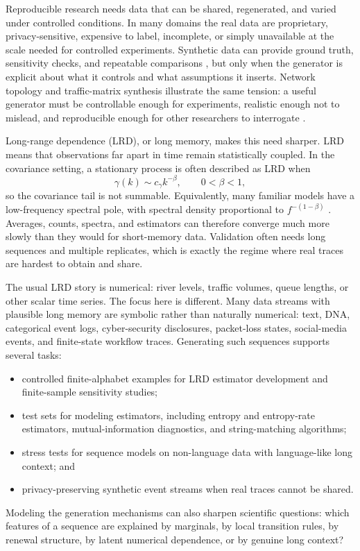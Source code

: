 \documentclass[journal]{IEEEtran}
\begin{document}
Reproducible research needs data that can be shared, regenerated, and varied
under controlled conditions.  In many domains the real data are proprietary,
privacy-sensitive, expensive to label, incomplete, or simply unavailable at the
scale needed for controlled experiments.  Synthetic data can provide ground
truth, sensitivity checks, and repeatable comparisons
\cite{ringberg2008_need}, but only when the generator is explicit about what it
controls and what assumptions it inserts.  Network topology and traffic-matrix
synthesis illustrate the same tension: a useful generator must be controllable
enough for experiments, realistic enough not to mislead, and reproducible enough
for other researchers to interrogate \cite{bowden2014_cold,tune2015_spatiotemporal}.

Long-range dependence (LRD), or long memory, makes this need sharper.  LRD
means that observations far apart in time remain statistically coupled.  In the
covariance setting, a stationary process is often described as LRD when
\begin{equation}
  \gamma(k) \sim c_\gamma k^{-\beta}, \qquad 0 < \beta < 1,
\end{equation}
so the covariance tail is not summable.  Equivalently, many familiar models have
a low-frequency spectral pole, with spectral density proportional to
$f^{-(1-\beta)}$ \cite{samorodnitsky2006_long,pipiras2017_long}.  Averages,
counts, spectra, and estimators can therefore converge much more slowly than
they would for short-memory data.  Validation often needs long sequences and
multiple replicates, which is exactly the regime where real traces are hardest
to obtain and share.

The usual LRD story is numerical: river levels, traffic volumes, queue lengths,
or other scalar time series.  The focus here is different.  Many data streams
with plausible long memory are symbolic rather than naturally numerical: text,
DNA, categorical event logs, cyber-security disclosures, packet-loss states,
social-media events, and finite-state workflow traces.  Generating such
sequences supports several tasks:
\begin{itemize}
\item controlled finite-alphabet examples for LRD estimator development and
finite-sample sensitivity studies;
\item test sets for modeling estimators, including entropy and entropy-rate
estimators, mutual-information diagnostics, and string-matching algorithms;
\item stress tests for sequence models on non-language data with language-like
long context; and
\item privacy-preserving synthetic event streams when real traces cannot be
shared.
\end{itemize}
Modeling the generation mechanisms can also sharpen scientific questions: which
features of a sequence are explained by marginals, by local transition rules, by
renewal structure, by latent numerical dependence, or by genuine long context?
\end{document}
